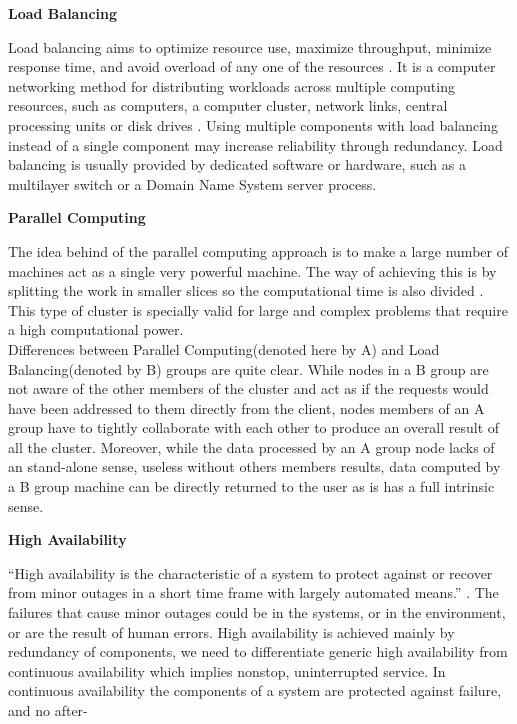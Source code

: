 \documentclass[english]{tktltiki2}
\theoremstyle{definition}
\theoremstyle{remark}
\begin{document}
\begin{flushleft}
\textbf{Load Balancing}
\end{flushleft}
Load balancing aims to optimize resource use, maximize throughput, minimize response time, and avoid overload of any one of the resources \cite{20192}. It is a computer networking method for distributing workloads across multiple computing resources, such as computers, a computer cluster, network links, central processing units or disk drives \cite{20193}.  Using multiple components with load balancing instead of a single component may increase reliability through redundancy. Load balancing is usually provided by dedicated software or hardware, such as a multilayer switch or a Domain Name System server process. 
\begin{flushleft}
\textbf{Parallel Computing}
\end{flushleft}
The idea behind of the parallel computing approach is to make a large number of machines act as a single very powerful machine. The way of achieving this is by splitting the work in smaller slices so the computational time is also divided \cite{Joubert2007ParallelC}. This type of cluster is specially valid for large and complex problems that require a high computational power.\\
Differences between Parallel Computing(denoted here by A) and Load Balancing(denoted by B) groups are quite clear. While nodes in a B group are not aware of the other members of the cluster and act as if the requests would have been addressed to them directly from the client, nodes members of an A group have to tightly collaborate with each other to produce an overall result of all the cluster. Moreover, while the data processed by an A group node lacks of an stand-alone sense, useless without others members results, data computed by a B group machine can be directly returned to the user as is has a full intrinsic sense.
\begin{flushleft}
\textbf{High Availability}
\end{flushleft}
“High availability is the characteristic of a system to protect against or recover from minor outages in a short time frame with largely automated means.” \cite{20194}.  The failures that cause minor outages could be in the systems, or in the environment, or are the result of human errors.
High availability is achieved mainly by redundancy of components, we need to differentiate generic high availability from continuous availability which implies nonstop, uninterrupted service. In continuous availability the components of a system are protected against failure, and no after-
\end{document}
